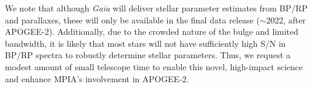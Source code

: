 \documentclass[a4paper]{article}
\begin{document}
\begin{ObservingProgram}
We note that although \textit{Gaia} will deliver stellar parameter estimates from BP/RP and parallaxes, these will only be available in the final data release ($\sim$2022, after APOGEE-2). Additionally, due to the crowded nature of the bulge and limited bandwidth, it is likely that most stars will not have sufficiently high S/N in BP/RP spectra to robustly determine stellar parameters.  Thus, we request a modest amount of small telescope time to enable this novel, high-impact science and enhance MPIA's involvement in APOGEE-2.

\end{ObservingProgram}
%
%
%
%
%
\end{document}
